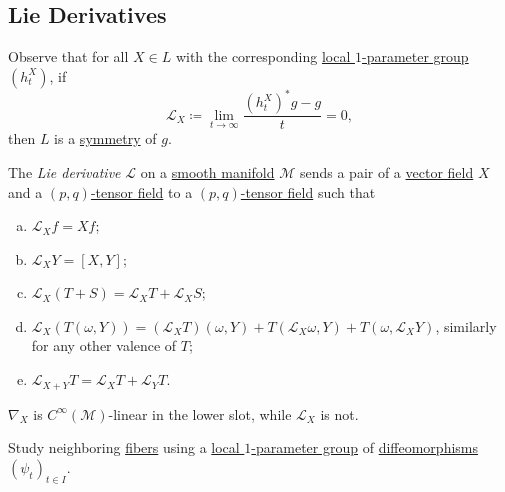 \subsection{Lie Derivatives}\label{subsection:Lie-Derivatives}
Observe that for all \(X\in L\) with the corresponding \hyperref[def:local-1-parameter-group]{local \(1\)-parameter group} \((h^X_t)\), if
\[
	\mathcal{L} _X \coloneqq \lim_{t \to \infty} \frac{(h^X_t)^{\ast} g - g}{t} = 0,
\]
then \(L\) is a \hyperref[def:symmetry]{symmetry} of \(g\).

\begin{definition}\label{def:Lie-derivative}
	The \emph{Lie derivative} \(\mathcal{L} \) on a \hyperref[def:smooth-manifold]{smooth manifold} \(\mathcal{M} \) sends a pair of a \hyperref[def:vector-field]{vector field} \(X\) and a \hyperref[def:tensor-field]{\((p, q)\)-tensor field} to a \hyperref[def:tensor-field]{\((p, q)\)-tensor field} such that
	\begin{enumerate}[(a)]
		\item \(\mathcal{L} _X f = Xf\);
		\item \(\mathcal{L} _X Y = [X, Y]\);
		\item \(\mathcal{L} _X(T + S) = \mathcal{L} _X T + \mathcal{L} _X S\);
		\item \(\mathcal{L} _X(T(\omega , Y)) = (\mathcal{L} _X T)(\omega , Y) + T(\mathcal{L} _X \omega , Y) + T(\omega , \mathcal{L} _X Y)\), similarly for any other valence of \(T\);
		\item \(\mathcal{L} _{X+Y} T = \mathcal{L} _X T + \mathcal{L} _Y T\).
	\end{enumerate}
\end{definition}

\begin{remark}
	\(\nabla _X\) is \(C^{\infty} (\mathcal{M} )\)-linear in the lower slot, while \(\mathcal{L} _X\) is not.
\end{remark}

\begin{intuition}
	Study neighboring \hyperref[def:fiber]{fibers} using a \hyperref[def:local-1-parameter-group]{local \(1\)-parameter group} of \hyperref[def:diffeomorphism]{diffeomorphisms} \((\psi _t)_{t\in I}\).
\end{intuition}
